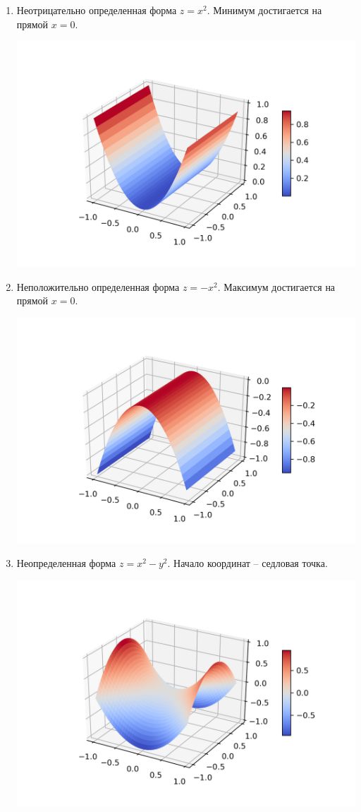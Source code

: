 \begin{enumerate}
\item Неотрицательно определенная форма $z = x^2$. Минимум достигается на прямой $ x = 0$.

\includegraphics[scale = 0.5]{Figures/graph_non_negative.png}

\item Неположительно определенная форма $z = - x^2$. Максимум достигается на прямой $x = 0$.

\includegraphics[scale = 0.5]{Figures/graph_non_positive.png}

\item Неопределенная форма $z = x^2 - y^2$. Начало координат -- седловая точка.

\includegraphics[scale = 0.5]{Figures/graph_saddle.png}
\end{enumerate}


